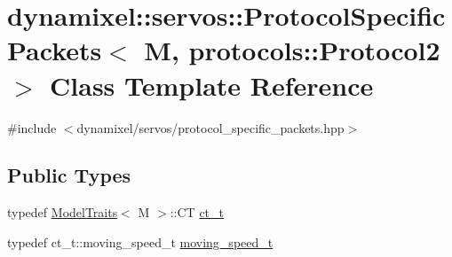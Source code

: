 \hypertarget{classdynamixel_1_1servos_1_1_protocol_specific_packets_3_01_m_00_01protocols_1_1_protocol2_01_4}{}\section{dynamixel\+:\+:servos\+:\+:Protocol\+Specific\+Packets$<$ M, protocols\+:\+:Protocol2 $>$ Class Template Reference}
\label{classdynamixel_1_1servos_1_1_protocol_specific_packets_3_01_m_00_01protocols_1_1_protocol2_01_4}


{\ttfamily \#include $<$dynamixel/servos/protocol\+\_\+specific\+\_\+packets.\+hpp$>$}

\subsection*{Public Types}
\begin{DoxyCompactItemize}
\item 
typedef \hyperlink{structdynamixel_1_1servos_1_1_model_traits}{Model\+Traits}$<$ M $>$\+::CT \hyperlink{classdynamixel_1_1servos_1_1_protocol_specific_packets_3_01_m_00_01protocols_1_1_protocol2_01_4_a145dc648f17fe5d401b917095a28e13f}{ct\+\_\+t}
\item 
typedef ct\+\_\+t\+::moving\+\_\+speed\+\_\+t \hyperlink{classdynamixel_1_1servos_1_1_protocol_specific_packets_3_01_m_00_01protocols_1_1_protocol2_01_4_a8772c5840284f3a4f63b31f439084ab0}{moving\+\_\+speed\+\_\+t}
\end{DoxyCompactItemize}
